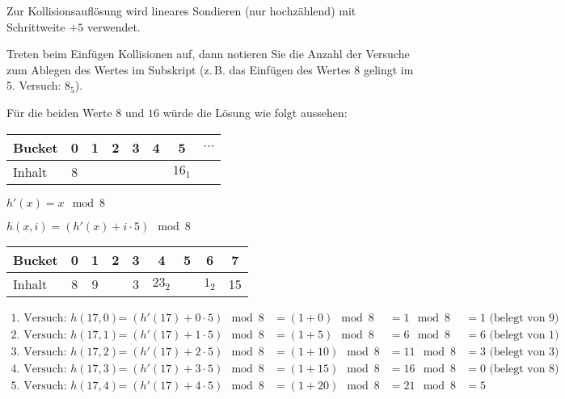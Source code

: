\documentclass{lehramt-informatik}
\begin{document}
\begin{enumerate}
Zur Kollisionsauflösung wird lineares Sondieren (nur hochzählend) mit
Schrittweite $+5$ verwendet.

Treten beim Einfügen Kollisionen auf, dann notieren Sie die Anzahl der
Versuche zum Ablegen des Wertes im Subskript (z.\,B. das Einfügen des
Wertes 8 gelingt im 5. Versuch: $8_5$).


Für die beiden Werte $8$ und $16$ würde die Lösung wie folgt aussehen:

\begin{center}
\begin{tabular}{l|ccccccc}
Bucket    & 0  & 1      & 2 & 3 & 4 & 5 &  $\cdots$  \\\hline
Inhalt    & 8 & &&&& $16_1$\\
\end{tabular}
\end{center}

\begin{antwort}
$h'(x) = x \mod 8$

$h(x, i) = (h'(x) + i \cdot 5) \mod 8$




\begin{center}
\begin{tabular}{l|cccccccc}
Bucket    & 0  & 1 & 2     & 3 & 4      & 5 & 6     & 7 \\\hline
Inhalt    & 8  & 9 &       & 3 & $23_2$ &   & $1_2$ & 15 \\
\end{tabular}
\end{center}

{\tiny
\begin{equation*}
\begin{aligned}
\text{1. Versuch: } h(17, 0) &= (h'(17) + 0 \cdot 5) \mod 8 &= (1 + 0) \mod 8  &= 1 \mod 8  &= 1 \text{ (belegt von } 9)\\
\text{2. Versuch: } h(17, 1) &= (h'(17) + 1 \cdot 5) \mod 8 &= (1 + 5) \mod 8  &= 6 \mod 8  &= 6 \text{ (belegt von } 1)\\
\text{3. Versuch: } h(17, 2) &= (h'(17) + 2 \cdot 5) \mod 8 &= (1 + 10) \mod 8 &= 11 \mod 8 &= 3 \text{ (belegt von } 3)\\
\text{4. Versuch: } h(17, 3) &= (h'(17) + 3 \cdot 5) \mod 8 &= (1 + 15) \mod 8 &= 16 \mod 8 &= 0 \text{ (belegt von } 8)\\
\text{5. Versuch: } h(17, 4) &= (h'(17) + 4 \cdot 5) \mod 8 &= (1 + 20) \mod 8 &= 21 \mod 8 &= 5\\
\end{aligned}
\end{equation*}
}


\end{antwort}
\end{enumerate}
\end{document}

